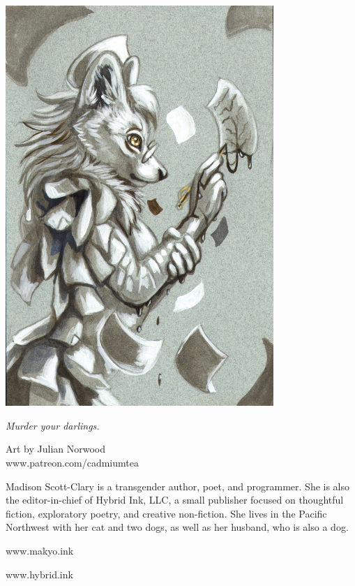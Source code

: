 \begin{paracol}{2}
\begin{leftcolumn}
\includegraphics[width=4in]{assets/cadmiumtea--MurderYourDarlings--makyo--G.jpg}
\begin{flushright}
{\footnotesize
{\allyFont \emph{Murder your darlings.}}

Art by Julian Norwood\\
www.patreon.com/cadmiumtea}
\end{flushright}
\end{leftcolumn}
\begin{rightcolumn}
    \null
    \vfill
\noindent Madison Scott-Clary is a transgender \mbox{author}, poet, and programmer. She is also the editor-in-chief of Hybrid Ink, LLC, a small publisher focused on thoughtful fiction, exploratory poetry, and creative non-fiction. She lives in the Pacific Northwest with her cat and two dogs, as well as her husband, who is also a dog.


\begin{center}
    www.makyo.ink

    www.hybrid.ink
\end{center}
\vfill
\newpage
\end{rightcolumn}
\end{paracol}
\null{}
\pagestyle{empty}
\printindex
